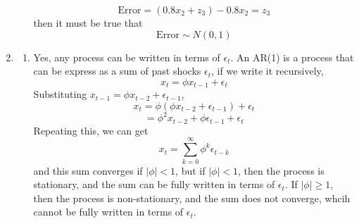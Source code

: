 \documentclass[12pt]{article}
\begin{document}
\begin{enumerate}
\begin{enumerate}
        \[ \text{Error} = (0.8x_2 + z_3) - 0.8x_2 = z_3 \]
        then it must be true that 
        \[ \text{Error} \sim N(0, 1) \]
    \end{enumerate}
    \item \begin{enumerate}
        The AR(1) model with mean 0 is given by
    \[ x_t = \phi x_{t-1} + z_t \]
    where $z_t \sim N(0, \sigma^2)$.
    Then it must be true that the matrix form looks something like this
    \[
    \begin{bmatrix}
        x_1 \\
        x_2 \\
        x_3 \\
        \vdots \\
        x_n
    \end{bmatrix}
    =
    \begin{bmatrix}
        \phi & 0 & 0 & \cdots & 0 \\
        1 & \phi & 0 & \cdots & 0 \\
        0 & 1 & \phi & \cdots & 0 \\
        \vdots & \vdots & \vdots & \ddots & \vdots \\
        0 & 0 & 0 & \cdots & \phi
    \end{bmatrix}
    \begin{bmatrix}
        x_0 \\
        x_{1} \\
        x_{2} \\
        \vdots \\
        x_{n-1}
    \end{bmatrix}
    +
    \begin{bmatrix}
        \epsilon_1 \\
        \epsilon_2 \\
        \epsilon_3 \\
        \vdots \\
        \epsilon_n
    \end{bmatrix}
    \]
    The backshift operator $B$ is defined as
    \[ Bx_t = x_{t-1} \]
    then, the AR(1) model can be written as
    \[ e_t = x_t - \phi x_{t-1} \]
    \[ (1 - \phi B)x_t = e_t \]
    \item Yes, any process can be written in terms of $\epsilon_t$.
    An AR(1) is a process that can be express as a sum of
    past shocks $\epsilon_t$, if we write it recursively,
    \[ x_t = \phi x_{t-1} + \epsilon_t \]
    Substituting $x_{t-1} = \phi x_{t-2} + \epsilon_{t-1}$,
    \[ x_t = \phi(\phi x_{t-2} + \epsilon_{t-1}) + \epsilon_t \]
    \[ = \phi^2 x_{t-2} + \phi \epsilon_{t-1} + \epsilon_t \]
    Repeating this, we can get
    \[ x_t = \sum_{k=0}^{\infty} \phi^k \epsilon_{t-k} \]
    and this sum converges if $|\phi| < 1$, but if
    $|\phi| < 1$, then the process is stationary,
    and the sum can be fully written in terms of $\epsilon_t$.
    If $|\phi| \geq 1$, then the process is non-stationary,
    and the sum does not converge, whcih cannot be fully
    written in terms of $\epsilon_t$.
    \end{enumerate}
    
\end{enumerate}
\end{document}
